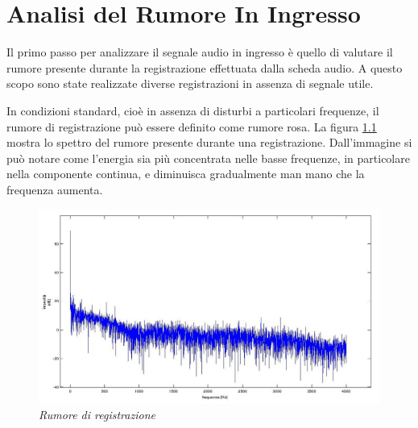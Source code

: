 \chapter{Analisi del Rumore In Ingresso}\label{cap:rumore}

Il primo passo per analizzare il segnale audio in ingresso è quello di valutare il rumore presente durante la registrazione effettuata dalla scheda audio. 
A questo scopo sono state realizzate diverse registrazioni in assenza di segnale utile. 

In condizioni standard, cioè in assenza di disturbi a particolari frequenze, il rumore di registrazione può essere definito come rumore rosa.
La figura \ref{fig:rumore} mostra lo spettro del rumore presente durante una registrazione.
Dall'immagine si può notare come l'energia sia più concentrata nelle basse frequenze, in particolare nella componente continua, e diminuisca gradualmente man mano che la frequenza aumenta.

 
	\begin{figure}[h]
	  \begin{center} 
	    \includegraphics[width=\textwidth*\real{0.9}]{images/ch_02/spettro_rumore.jpg}
	  \end{center} 
	  \caption{\textit{Rumore di registrazione}}  
	  \label{fig:rumore}
	\end{figure}



